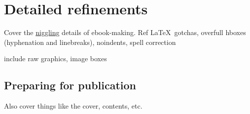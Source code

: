 \chapter{Detailed refinements} %
\label{cha:detailed_refinements}

Cover the \href{http://www.thefreedictionary.com/niggling}{niggling} details of ebook-making. Ref \LaTeX\ gotchas, overfull hboxes (hyphenation and linebreaks), noindents, spell correction

include raw graphics, image boxes

\section{Preparing for publication} %
\label{sec:preparing_for_publication}

Also cover things like the cover,  contents, etc.



